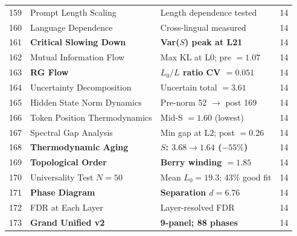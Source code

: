 \documentclass[11pt,a4paper]{article}
\begin{document}
\begin{center}
\begin{longtable}{@{}clll@{}}
\midrule
159 & Prompt Length Scaling & Length dependence tested & 14 \\
160 & Language Dependence & Cross-lingual measured & 14 \\
161 & \textbf{Critical Slowing Down} & \textbf{Var($S$) peak at L21} & 14 \\
162 & Mutual Information Flow & Max KL at L0; pre $= 1.07$ & 14 \\
163 & \textbf{RG Flow} & \textbf{$L_0/L$ ratio CV $= 0.051$} & 14 \\
164 & Uncertainty Decomposition & Uncertain total $= 3.61$ & 14 \\
165 & Hidden State Norm Dynamics & Pre-norm 52 $\to$ post 169 & 14 \\
166 & Token Position Thermodynamics & Mid-S $= 1.60$ (lowest) & 14 \\
167 & Spectral Gap Analysis & Min gap at L2; post $= 0.26$ & 14 \\
168 & \textbf{Thermodynamic Aging} & \textbf{$S$: $3.68 \to 1.64$ ($-55\%$)} & 14 \\
169 & \textbf{Topological Order} & \textbf{Berry winding $= 1.85$} & 14 \\
170 & Universality Test $N = 50$ & Mean $L_0 = 19.3$; 43\% good fit & 14 \\
171 & \textbf{Phase Diagram} & \textbf{Separation $d = 6.76$} & 14 \\
172 & FDR at Each Layer & Layer-resolved FDR & 14 \\
173 & \textbf{Grand Unified v2} & \textbf{9-panel; 88 phases} & 14 \\
\end{longtable}
\end{center}
\end{document}
